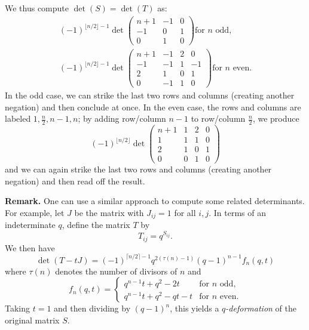 \documentclass[amssymb,twocolumn,pra,10pt,aps]{revtex4-1}
\begin{document}
\begin{itemize}
We thus compute $\det(S) = \det(T)$ as:
\begin{gather*}
(-1)^{\lfloor n/2 \rfloor-1}
\det \begin{pmatrix}
n+1 & -1 & 0 \\
-1 & 0 & 1 \\
0 & 1  & 0
\end{pmatrix} \mbox{for $n$ odd,} \\
(-1)^{\lfloor n/2 \rfloor-1}
 \det \begin{pmatrix}
n+1 & -1 & 2 & 0 \\
-1 & -1 & 1 & -1 \\
2 & 1 & 0 & 1 \\
0 & -1 & 1 & 0
\end{pmatrix} \mbox{for $n$ even.}
\end{gather*}
In the odd case, we can strike the last two rows and columns (creating another negation) and then conclude at once. In the even case, the rows and columns are labeled $1, \frac{n}{2}, n-1, n$; by adding row/column $n-1$ to row/column $\frac{n}{2}$, we produce
\[
(-1)^{\lfloor n/2 \rfloor}
 \det \begin{pmatrix}
n+1 & 1 & 2 & 0 \\
1 & 1 & 1 & 0 \\
2 & 1 & 0 & 1 \\
0 & 0 & 1 & 0
\end{pmatrix}
\]
and we can again strike the last two rows and columns (creating another negation) and then read off the result.

\noindent
\textbf{Remark.}
One can use a similar approach to compute some related determinants.
For example, let $J$ be the matrix with $J_{ij} = 1$ for all $i,j$.
In terms of an indeterminate $q$, define the matrix $T$ by 
\[
T_{ij} = q^{S_{ij}}.
\]
We then have
\[
\det(T-tJ) = (-1)^{\lceil n/2 \rceil-1} q^{2(\tau(n)-1)} (q-1)^{n-1}f_n(q,t)
\]
where $\tau(n)$ denotes the number of divisors of $n$
and
\[
f_n(q,t) = \begin{cases} q^{n-1}t+q^2-2t & \mbox{for $n$ odd,} \\q^{n-1}t +q^2-qt-t & \mbox{for $n$ even.}
\end{cases}
\]
Taking $t=1$ and then dividing by $(q-1)^n$, this yields a \emph{$q$-deformation} of the original matrix $S$.

\end{itemize}
\end{document}
